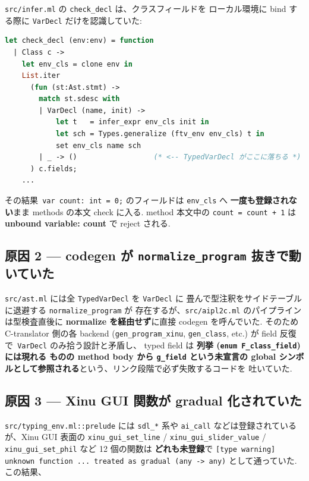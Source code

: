 \documentclass[11pt,a4paper]{article}
\begin{document}
\texttt{src/infer.ml} の \texttt{check\_decl} は、クラスフィールドを
ローカル環境に bind する際に \texttt{VarDecl} だけを認識していた:

\begin{lstlisting}[language=ocaml,caption={infer.ml の問題箇所 (修正前)}]
let check_decl (env:env) = function
  | Class c ->
    let env_cls = clone env in
    List.iter
      (fun (st:Ast.stmt) ->
        match st.sdesc with
        | VarDecl (name, init) ->
            let t   = infer_expr env_cls init in
            let sch = Types.generalize (ftv_env env_cls) t in
            set env_cls name sch
        | _ -> ()                  (* <-- TypedVarDecl がここに落ちる *)
      ) c.fields;
    ...
\end{lstlisting}

その結果\texttt{ var count: int = 0;} のフィールドは \texttt{env\_cls}
へ\textbf{ 一度も登録されない}まま methods の本文 check に入る.
method 本文中の \texttt{count = count + 1} は\textbf{ unbound variable:
count} で reject される.

\subsection{原因 2 — codegen が \texttt{normalize\_program} 抜きで動いていた}

\texttt{src/ast.ml} には全 \texttt{TypedVarDecl} を \texttt{VarDecl} に
畳んで型注釈をサイドテーブルに退避する \texttt{normalize\_program} が
存在するが、\texttt{src/aipl2c.ml} のパイプラインは型検査直後に
\textbf{normalize を経由せず}に直接 codegen を呼んでいた.
そのため C-translator 側の各 backend
(\texttt{gen\_program\_xinu}, \texttt{gen\_class}, etc.) が
field 反復で\texttt{ VarDecl} のみ拾う設計と矛盾し、
typed field は\textbf{ 列挙 (\texttt{enum F\_class\_field}) には現れる
ものの method body から \texttt{g\_field} という未宣言の global
シンボルとして参照される}という、リンク段階で必ず失敗するコードを
吐いていた.

\subsection{原因 3 — Xinu GUI 関数が gradual 化されていた}

\texttt{src/typing\_env.ml::prelude} には \texttt{sdl\_*} 系や
\texttt{ai\_call} などは登録されているが、Xinu GUI 表面の
\texttt{xinu\_gui\_set\_line} / \texttt{xinu\_gui\_slider\_value} /
\texttt{xinu\_gui\_set\_phil} など 12 個の関数は\textbf{ どれも未登録}で
\texttt{[type warning] unknown function ... treated as gradual (any -> any)}
として通っていた.この結果、
\end{document}
